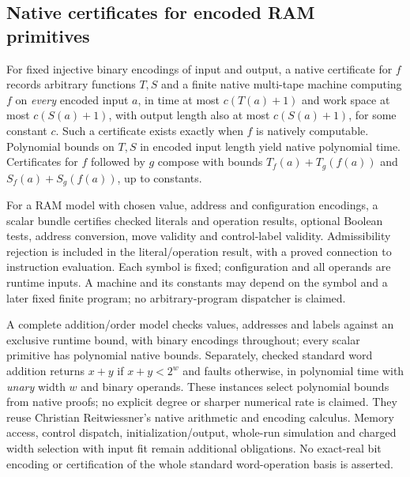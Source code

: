 \begin{result}
\subsection{Native certificates for encoded RAM primitives}
For fixed injective binary encodings of input and output, a native certificate for $f$
records arbitrary functions $T,S$ and a finite native multi-tape machine computing $f$ on
\emph{every} encoded input $a$, in time at most $c(T(a)+1)$ and work space at most
$c(S(a)+1)$, with output length also at most $c(S(a)+1)$, for some constant $c$.
Such a certificate exists exactly when $f$ is natively computable. Polynomial bounds on
$T,S$ in encoded input length yield native polynomial time. Certificates for $f$ followed
by $g$ compose with bounds $T_f(a)+T_g(f(a))$ and $S_f(a)+S_g(f(a))$, up to constants.

For a RAM model with chosen value, address and configuration encodings, a scalar bundle
certifies checked literals and operation results, optional Boolean tests, address conversion,
move validity and control-label validity. Admissibility rejection is included in the
literal/operation result, with a proved connection to instruction evaluation. Each symbol
is fixed; configuration and all operands are runtime inputs. A machine and its constants may
depend on the symbol and a later fixed finite program; no arbitrary-program dispatcher is claimed.

A complete addition/order model checks values, addresses and labels against an exclusive
runtime bound, with binary encodings throughout; every scalar primitive has polynomial native
bounds. Separately, checked standard word addition returns $x+y$ if $x+y<2^w$ and faults otherwise,
in polynomial time with \emph{unary} width $w$ and binary operands. These instances select
polynomial bounds from native proofs; no explicit degree or sharper numerical rate is claimed.
They reuse Christian Reitwiessner's native arithmetic and encoding calculus. Memory access,
control dispatch, initialization/output, whole-run simulation and charged width selection with
input fit remain additional obligations. No exact-real bit encoding or certification of the
whole standard word-operation basis is asserted. \citep{Sipser2013,Tromino2025}
\end{result}

